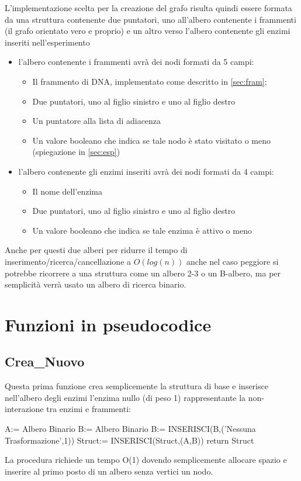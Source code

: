 \documentclass[a4paper,10pt]{article}
\begin{document}
L'implementazione scelta per la creazione del grafo risulta quindi essere formata da una struttura contenente due puntatori, uno all'albero contenente i frammenti (il grafo orientato vero e proprio) e un altro verso l'albero contenente gli enzimi inseriti nell'esperimento 
\begin{itemize}
\item l'albero contenente i frammenti avrà dei nodi formati da 5 campi: 
\begin{itemize}
\item Il frammento di DNA, implementato come descritto in \ref{sec:fram};
\item Due puntatori, uno al figlio sinistro e uno al figlio destro
\item Un puntatore alla lista di adiacenza
\item Un valore booleano che indica se tale nodo è stato visitato o meno (spiegazione in \ref{sec:esp})
\end{itemize}
\item l'albero contenente gli enzimi inseriti avrà dei nodi formati da 4 campi:
\begin{itemize}
\item Il nome dell'enzima
\item Due puntatori, uno al figlio sinistro e uno al figlio destro
\item Un valore booleano che indica se tale enzima è attivo o meno
\end{itemize}
\end{itemize}
Anche per questi due alberi per ridurre il tempo di inserimento/ricerca/cancellazione a $O(log(n))$ anche nel caso peggiore si potrebbe ricorrere a una struttura come un albero 2-3 o un B-albero, ma per semplicità verrà usato un albero di ricerca binario.

\section{Funzioni in pseudocodice}
\subsection{Crea\_{}Nuovo}
Questa prima funzione crea semplicemente la struttura di base e inserisce nell'albero degli enzimi l'enzima nullo (di peso 1) rappresentante la non-interazione tra enzimi e frammenti:

\begin{algorithm}[H]
A:= Albero Binario\;
B:= Albero Binario\;
B:= INSERISCI(B,('Nessuna Trasformazione',1))\;
Struct:= INSERISCI(Struct,(A,B))\;
return Struct\;
\end{algorithm}
La procedura richiede un tempo O(1) dovendo semplicemente allocare spazio e inserire al primo posto di un albero senza vertici un nodo.
\end{document}
